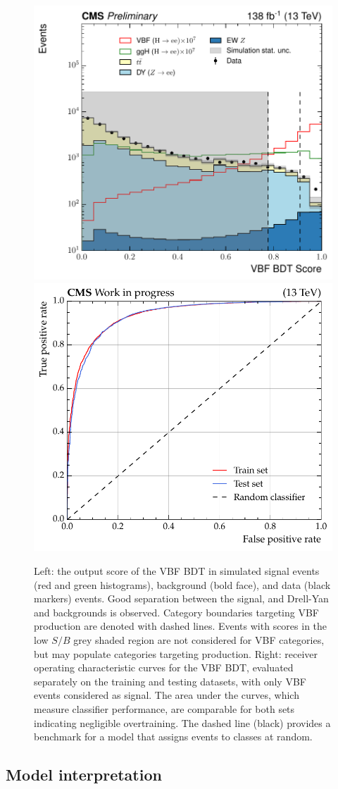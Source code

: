 \begin{figure}[htbp!]
\centering
\includegraphics[width =0.485\linewidth]{Figures/Hee/VBF/dataMC/VBF_BDT_output_score.pdf}\hfill%
\includegraphics[width =0.5\linewidth]{Figures/Hee/VBF/dataMC/VBF_BDT_ROC_curve.pdf}\hfill%
\caption[The output score of the VBF BDT and associated ROC curve.]{Left: the output score of the VBF BDT in simulated signal events (red and green histograms), background (bold face), and data (black markers) events. Good separation between the signal, and Drell-Yan and \ttbar backgrounds is observed. Category boundaries targeting VBF production are denoted with dashed lines. Events with scores in the low $S/B$ grey shaded region are not considered for VBF categories, but may populate categories targeting \ggH production. Right: receiver operating characteristic curves for the VBF BDT, evaluated separately on the training and testing datasets, with only VBF events considered as signal. The area under the curves, which measure classifier performance, are comparable for both sets indicating negligible overtraining. The dashed line (black) provides a benchmark for a model that assigns events to classes at random.}
\label{fig:vbf_out_score_and_rocs}
\end{figure}

\subsection{Model interpretation}

